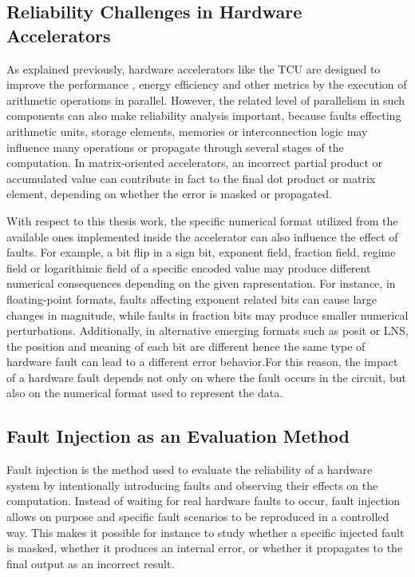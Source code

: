 \subsection{Reliability Challenges in Hardware Accelerators}

As explained previously, hardware accelerators like the TCU are designed to improve the performance , energy efficiency  and other metrics by the execution of arithmetic operations in parallel. However, the related level of parallelism in such components can also make reliability analysis important, because faults effecting arithmetic units, storage elements, memories or interconnection logic may influence many operations or propagate through several stages of the computation. In matrix-oriented accelerators, an incorrect partial product or accumulated value can contribute in fact to the final dot product or matrix element, depending on whether the error is masked or propagated. 

With respect to this thesis work, the specific numerical format utilized from the available ones implemented inside the accelerator can also influence the effect of faults. For example, a bit flip in a sign bit, exponent field, fraction field, regime field or logarithimic field of a specific encoded value may produce different numerical consequences depending on the given rapresentation. For instance, in floating-point formats, faults affecting exponent related bits can cause large changes in magnitude, while faults in fraction bits may produce smaller numerical perturbations. Additionally, in alternative emerging formats such as posit or LNS, the position and meaning of each bit are different hence the same type of hardware fault can lead to a different error behavior.For this reason, the impact of a hardware fault depends not only on
where the fault occurs in the circuit, but also on the numerical format
used to represent the data.

\subsection{Fault Injection as an Evaluation Method}
Fault injection is the method used to evaluate the reliability of a hardware system by intentionally introducing faults and observing their effects on the computation. Instead of waiting for real hardware faults to occur, fault injection allows on purpose and specific fault scenarios to be reproduced in a controlled way. This makes it possible for instance to study whether a specific injected fault is masked, whether it produces an internal error, or whether it propagates to the final output as an incorrect result.

